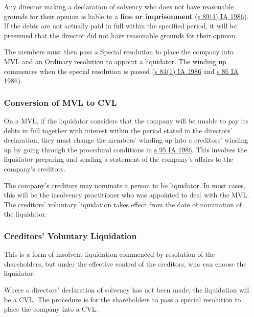 \documentclass[
]{article}
\begin{document}
Any director making a declaration of solvency who does not have
reasonable grounds for their opinion is liable to a \textbf{fine or
imprisonment}
(\href{https://www.legislation.gov.uk/ukpga/1986/45/section/89}{s 89(4)
IA 1986}). If the debts are not actually paid in full within the
specified period, it will be presumed that the director did not have
reasonable grounds for their opinion.

The members must then pass a Special resolution to place the company
into MVL and an Ordinary resolution to appoint a liquidator. The winding
up commences when the special resolution is passed
(\href{https://www.legislation.gov.uk/ukpga/1986/45/section/84}{s 84(1)
IA 1986} and
\href{https://www.legislation.gov.uk/ukpga/1986/45/section/86}{s 86 IA
1986}).

\hypertarget{conversion-of-mvl-to-cvl}{%
\subsubsection{Conversion of MVL to
CVL}\label{conversion-of-mvl-to-cvl}}

On a MVL, if the liquidator considers that the company will be unable to
pay its debts in full together with interest within the period stated in
the directors' declaration, they must change the members' winding up
into a creditors' winding up by going through the procedural conditions
in \href{https://www.legislation.gov.uk/ukpga/1986/45/section/95}{s 95
IA 1986}. This involves the liquidator preparing and sending a statement
of the company's affairs to the company's creditors.

The company's creditors may nominate a person to be liquidator. In most
cases, this will be the insolvency practitioner who was appointed to
deal with the MVL. The creditors' voluntary liquidation takes effect
from the date of nomination of the liquidator.

\hypertarget{creditors-voluntary-liquidation}{%
\subsubsection{Creditors' Voluntary
Liquidation}\label{creditors-voluntary-liquidation}}

This is a form of insolvent liquidation commenced by resolution of the
shareholders, but under the effective control of the creditors, who can
choose the liquidator.

Where a directors' declaration of solvency has not been made, the
liquidation will be a CVL. The procedure is for the shareholders to pass
a special resolution to place the company into a CVL.
\end{document}

